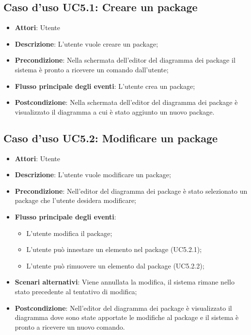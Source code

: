 \documentclass[../AnalisiDeiRequisiti.tex]{subfiles}
\begin{document}
			\subsection{Caso d'uso UC5.1: Creare un package}
			\begin{itemize}
				\item \textbf{Attori}: Utente
				\item \textbf{Descrizione}: L'utente vuole creare un package;
				\item \textbf{Precondizione}: Nella schermata dell'editor del diagramma dei package il sistema è pronto a ricevere un comando dall'utente;
				\item \textbf{Flusso principale degli eventi}: L'utente crea un package;
				\item \textbf{Postcondizione}: Nella schermata dell'editor del diagramma dei package è visualizzato il diagramma a cui è stato aggiunto un nuovo package.
			\end{itemize}
			\subsection{Caso d'uso UC5.2: Modificare un package}
			\begin{itemize}
				\item \textbf{Attori}: Utente
				\item \textbf{Descrizione}: L'utente vuole modificare un package;
				\item \textbf{Precondizione}: Nell'editor del diagramma dei package è stato selezionato un package che l'utente desidera modificare;
				\item \textbf{Flusso principale degli eventi}: \begin{itemize}
					\item L'utente modifica il package;
					\item L'utente può innestare un elemento nel package (UC5.2.1);
					\item L'utente può rimuovere un elemento dal package (UC5.2.2);
				\end{itemize}
				\item \textbf{Scenari alternativi}: Viene annullata la modifica, il sistema	rimane nello stato precedente al tentativo di modifica;
				\item \textbf{Postcondizione}: Nell'editor del diagramma dei package è visualizzato il diagramma dove sono state apportate le modifiche al package e il sistema è pronto a ricevere un nuovo comando.
			\end{itemize}
\end{document}
